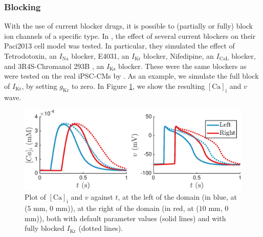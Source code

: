\documentclass{article}
\begin{document}
\subsubsection{Blocking} \label{Blocking}
With the use of current blocker drugs, it is possible to (partially or fully) block ion channels of a specific type. In \cite{Paci2013}, the effect of several current blockers on their Paci2013 cell model was tested. In particular, they simulated the effect of Tetrodotoxin, an $I_{\mathrm{Na}}$ blocker, E4031, an $I_{\mathrm{Kr}}$ blocker, Nifedipine, an $I_{\mathrm{CaL}}$ blocker, and 3R4S-Chromanol 293B , an $I_{\mathrm{Ks}}$ blocker. These were the same blockers as were tested on the real iPSC-CMs by \cite{Ma2011}. As an example, we simulate the full block of $I_{\mathrm{Kr}}$, by setting $g_{\mathrm{Kr}}$ to zero. In Figure \ref{fig:blocking}, we show the resulting $[\mathrm{Ca}]_{\mathrm{i}}$ and $v$ wave. 
%
\begin{figure}
   \includegraphics[width=1\linewidth]{blocking} 
    \caption{Plot of $[\mathrm{Ca}]_{\mathrm{i}}$ and $v$ against $t$, at the left of the domain (in blue, at ($5$ mm, $0$ mm)), at the right of the domain (in red, at ($10$ mm, $0$ mm)), both with default parameter values (solid lines) and with fully blocked $I_{\mathrm{Kr}}$ (dotted lines).}
    \label{fig:blocking}
\end{figure}
%
\end{document}

